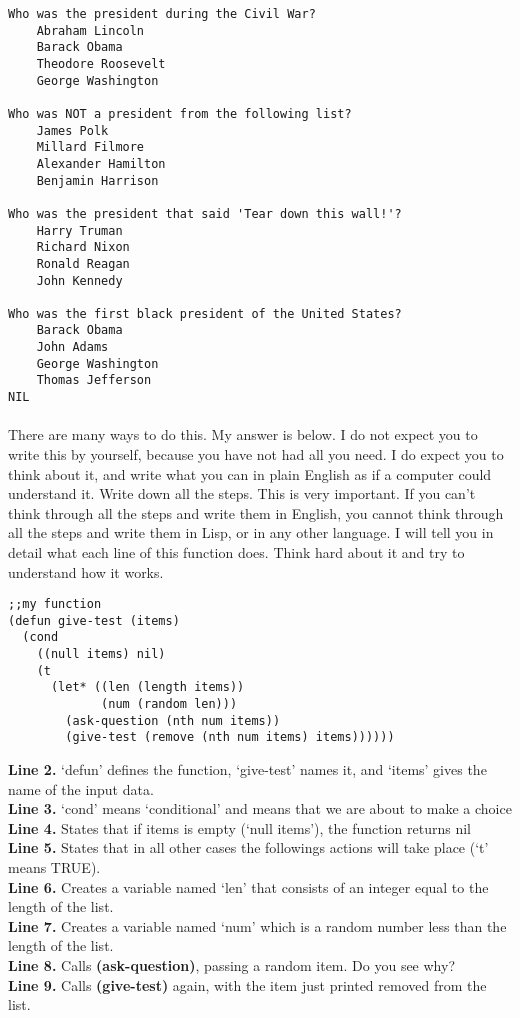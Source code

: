 \documentclass{article}
\begin{document}
\begin{lstlisting}
Who was the president during the Civil War?
    Abraham Lincoln
    Barack Obama
    Theodore Roosevelt
    George Washington

Who was NOT a president from the following list?
    James Polk
    Millard Filmore
    Alexander Hamilton
    Benjamin Harrison

Who was the president that said 'Tear down this wall!'?
    Harry Truman
    Richard Nixon
    Ronald Reagan
    John Kennedy

Who was the first black president of the United States?
    Barack Obama
    John Adams
    George Washington
    Thomas Jefferson
NIL
\end{lstlisting}

\paragraph{}There are many ways to do this. My answer is below. I do not expect you to write this by yourself, because you have not had all you need. I do expect you to think about it, and write what you can in plain English as if a computer could understand it. Write down all the steps. This is very important. If you can't think through all the steps and write them in English, you cannot think through all the steps and write them in Lisp, or in any other language. I will tell you in detail what each line of this function does. Think hard about it and try to understand how it works.

\lstset{language=Lisp,numbers=left,keepspaces=false,basicstyle=\small,numberstyle=\tiny,breaklines=true,showstringspaces=false}
\begin{lstlisting}
;;my function
(defun give-test (items)
  (cond
    ((null items) nil)
    (t
      (let* ((len (length items))
             (num (random len)))
        (ask-question (nth num items))
        (give-test (remove (nth num items) items))))))
\end{lstlisting}

\textbf{Line 2.} `defun' defines the function, `give-test' names it, and `items' gives the name of the input data.\\
\textbf{Line 3.} `cond' means `conditional' and means that we are about to make a choice\\
\textbf{Line 4.} States that if items is empty (`null items'), the function returns nil\\
\textbf{Line 5.} States that in all other cases the followings actions will take place (`t' means TRUE).\\
\textbf{Line 6.} Creates a variable named `len' that consists of an integer equal to the length of the list.\\
\textbf{Line 7.} Creates a variable named `num' which is a random number less than the length of the list.\\
\textbf{Line 8.} Calls \textbf{(ask-question)}, passing a random item. Do you see why?\\
\textbf{Line 9.} Calls \textbf{(give-test)} again, with the item just printed removed from the list.\\
\end{document}
